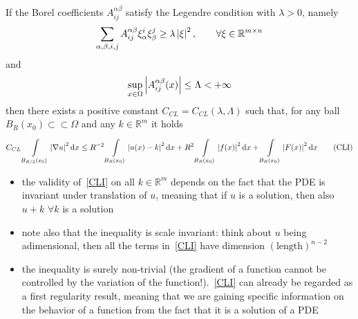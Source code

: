 \begin{thm}
	If the Borel coefficients \(A_{ij}^{\alpha \beta}\) satisfy the Legendre condition with \(\lambda>0\), namely
	\begin{gather}
		\sum_{\alpha,\beta,i,j} A_{ij}^{\alpha\beta} \xi_{\alpha}^{i} \xi_{\beta}^{j} \geq \lambda \left\lvert\xi\right\rvert^{2}, \qquad \forall \xi \in \mathbb{R}^{m \times n}
	\end{gather}
	and
	\begin{gather}
		\sup_{x \in \Omega} \left\lvert A_{ij}^{\alpha\beta}(x)\right\rvert \leq \Lambda < + \infty
	\end{gather}
	then there exists a positive constant \(C_{CL} = C_{CL}(\lambda, \Lambda)\) such that, for any ball \(B_{R}(x_{0})\subset \subset \Omega \) and any \(k \in \mathbb{R}^{m}\) it holds
	\begin{gather}
		C_{CL}\int\limits_{B_{\frac{R}{2}}(x_{0})}^{} \abs{\nabla u}^{2} \dd{x} \leq R^{-2}\int\limits_{B_{R}(x_{0})}^{} \abs{u(x)-k}^{2} \dd{x} + R^{2}\int\limits_{B_{R}(x_{0})} \abs{f(x)}^{2} \dd{x} +  \int\limits_{B_{R}(x_{0})} \abs{F(x)}^{2} \dd{x} \tag{CLI}\label{CLI}
	\end{gather}
\end{thm}
\begin{remark}
	\begin{itemize}
		\item the validity of~\eqref{CLI} on all \(k \in \mathbb{R}^{m}\) depends on the fact that the PDE is invariant under translation of \(u\), meaning that if \(u\) is a solution, then also \(u+k\) \(\forall k\) is a solution
		\item note also that the inequality is scale invariant: think about \(u\) being adimensional, then all the terms in~\eqref{CLI} have dimension \({(\text{length})}^{n-2}\)
		\item the inequality is surely non-trivial (the gradient of a function cannot be controlled by the variation of the function!).~\eqref{CLI} can already be regarded as a first regularity result, meaning that we are gaining specific information on the behavior of a function from the fact that it is a solution of a PDE
	\end{itemize}
\end{remark}
